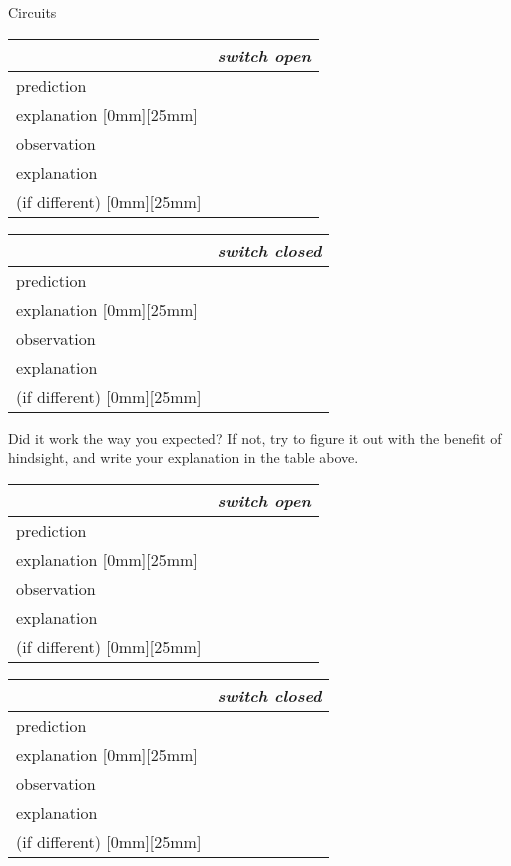 \begin{lab}{Circuits}
\newcommand{\circuittablestrut}{\raisebox{0mm}[0mm][25mm]{}}
\newcommand{\circuittabletwocols}[2]{
\begin{tabular}{|p{20mm}|p{42mm}|}
\hline
         & \emph{#1} \\
\hline
prediction & \\
\hline
explanation  \circuittablestrut &\\
\hline
observation & \\
\hline
explanation  & \\
(if different) \circuittablestrut & \\
\hline
\end{tabular}

\begin{tabular}{|p{20mm}|p{42mm}|}
\hline
         & \emph{#2} \\
\hline
prediction & \\
\hline
explanation \circuittablestrut  &\\
\hline
observation  & \\
\hline
explanation  & \\
(if different) \circuittablestrut & \\
\hline
\end{tabular}
}
\newcommand{\circuittableonecol}{
\begin{tabular}{|l|p{50mm}|}
\hline
prediction  &\\
\hline
explanation \circuittablestrut   &\\
\hline
observation &\\
\hline
explanation  & \\
(if different) \circuittablestrut &\\
\hline
\end{tabular}
}


\vfill\pagebreak[4]

\circuittabletwocols{switch open}{switch closed}

Did it work the way you expected? If not, try to figure it out with the benefit of
hindsight, and write your explanation in the table above.

\vfill\pagebreak[4]


\circuittabletwocols{switch open}{switch closed}

\vfill\pagebreak[4]


\end{lab}
